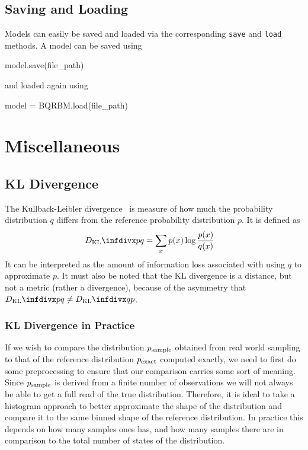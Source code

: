\subsection{Saving and Loading}
Models can easily be saved and loaded via the corresponding \texttt{save} and \texttt{load} methods.
A model can be saved using
\begin{python}
model.save(file_path)
\end{python}
and loaded again using
\begin{python}
model = BQRBM.load(file_path)
\end{python}

\section{Miscellaneous}
\subsection{KL Divergence}\label{app:kl_divergence}
The Kullback-Leibler divergence~\cite{kullback_1951} is measure of how much the probability distribution \( q \) differs from the reference probability distribution \( p \).
It is defined as
\begin{align}
    \DKL{p}{q}
        &= \sum_{x} p(x) \log\frac{p(x)}{q(x)}
\end{align}
It can be interpreted as the amount of information loss associated with using \( q \) to approximate \( p \).
It must also be noted that the KL divergence is a distance, but not a metric (rather a divergence), because of the asymmetry that \( \DKL{p}{q} \ne \DKL{q}{p} \).

\subsubsection{KL Divergence in Practice}\label{app:kl_divergence_in_practice}
If we wish to compare the distribution \( p_{\text{sample}} \) obtained from real world sampling to that of the reference distribution \( p_{\text{exact}} \) computed exactly, we need to first do some preprocessing to ensure that our comparison carries some sort of meaning.
Since \( p_{\text{sample}} \) is derived from a finite number of observations we will not always be able to get a full read of the true distribution.
Therefore, it is ideal to take a histogram approach to better approximate the shape of the distribution and compare it to the same binned shape of the reference distribution.
In practice this depends on how many samples ones has, and how many samples there are in comparison to the total number of states of the distribution.

